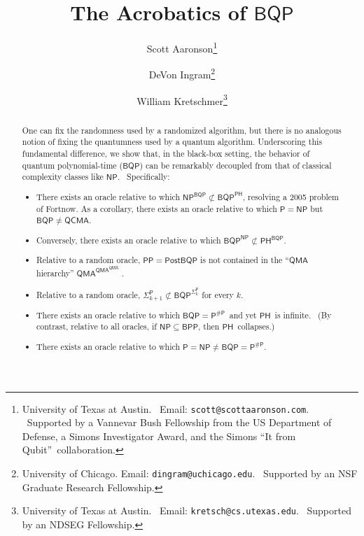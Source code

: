 \documentclass[11pt]{article}%
\begin{document}
\title{The Acrobatics of $\mathsf{BQP}$}
\author{Scott Aaronson\thanks{University of Texas at Austin. \ Email:
\texttt{scott@scottaaronson.com}. \ Supported by a Vannevar Bush Fellowship from the US
Department of Defense, a Simons Investigator Award, and the Simons
\textquotedblleft It from Qubit\textquotedblright\ collaboration.}
\and DeVon Ingram\thanks{University of Chicago. Email: \texttt{dingram@uchicago.edu}. \ Supported by an NSF Graduate Research Fellowship.}
\and William Kretschmer\thanks{University of Texas at Austin. \ Email:
\texttt{kretsch@cs.utexas.edu}. \ Supported by an NDSEG Fellowship.}}
\date{}
\maketitle

\begin{abstract}
One can fix the randomness used by a randomized algorithm, but there is no analogous notion of fixing the quantumness used by a quantum algorithm.  Underscoring this fundamental difference, we show that, in the black-box setting, the behavior of quantum
polynomial-time ($\mathsf{BQP}$) can be remarkably decoupled from that of
classical complexity classes like $\mathsf{NP}$. \ Specifically:

\begin{itemize}
\item There exists an oracle relative to
which $\mathsf{NP}^{\mathsf{BQP}}\not \subset \mathsf{BQP}^{\mathsf{PH}}$, resolving a 2005 problem of Fortnow. 
As a corollary, there exists an oracle relative to which $\mathsf{P} = \mathsf{NP}$ but $\mathsf{BQP} \neq \mathsf{QCMA}$.
\item Conversely, there exists an oracle relative to
which $\mathsf{BQP}^{\mathsf{NP}}\not \subset \mathsf{PH}^{\mathsf{BQP}}$.
\item Relative to a random oracle, $\mathsf{PP} = \mathsf{PostBQP}$ is not contained in the ``$\mathsf{QMA}$ hierarchy'' $\mathsf{QMA}^{\mathsf{QMA}^{\mathsf{QMA}^{\cdots}}}$. %
\item Relative to a random oracle, $\mathsf{\Sigma}_{k+1}^\mathsf{P} \not\subset \mathsf{BQP}^{\mathsf{\Sigma}_{k}^\mathsf{P}}$ for every $k$.
\item There exists an oracle relative to which $\mathsf{BQP} = \mathsf{P^{\# P}}$\ and yet $\mathsf{PH}$\ is infinite. \ (By contrast, relative to all oracles, if
$\mathsf{NP}\subseteq\mathsf{BPP}$, then $\mathsf{PH}$\ collapses.)
\item There exists an oracle relative to which $\mathsf{P}=\mathsf{NP} \neq \mathsf{BQP}=\mathsf{P}^{\mathsf{\#P}}$.
\end{itemize}


\end{abstract}
\end{document}
